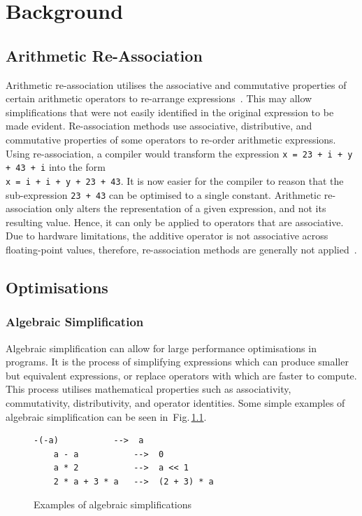 \documentclass[12pt,openany,a4paper]{book}
\newcommand{\fig}[1]  {Fig.\,\ref{#1}}		%
\begin{document}
\chapter{Background}
\label{bg}

\section{Arithmetic Re-Association}
\label{ara}

Arithmetic re-association utilises the associative and
commutative properties of certain arithmetic operators to re-arrange expressions~\cite{redund}. 
This may allow simplifications that were not easily identified in the original 
expression to be made evident. Re-association methods use associative,
distributive, and commutative properties of some operators to re-order arithmetic
expressions.
Using re-association, a compiler would transform the expression
\verb|x = 23 + i + y + 43 + i| into the form \\ \verb|x = i + i + y + 23 + 43|. It
is now easier for the compiler to reason that the sub-expression \verb|23 + 43|
can be optimised to a single constant.
Arithmetic re-association only alters the representation of a given expression,
and not its resulting value. Hence, it can only be applied to operators that
are associative. Due to hardware limitations, the additive operator is not
associative across floating-point values, therefore, re-association methods are generally not
applied~\cite{floats}.

\section{Optimisations}
\label{opt}

\subsection{Algebraic Simplification}
\label{as}

Algebraic simplification can allow for large performance optimisations in
programs. It is the process of simplifying expressions which can produce smaller
but equivalent expressions, or replace operators with which are faster to compute. 
This process utilises mathematical properties such as associativity, commutativity, 
distributivity, and operator identities. Some simple examples of algebraic
simplification can be seen in~\fig{simp}. 

\begin{figure}[htbp]
    \hspace{0.25\textwidth}
    \begin{minipage}[c]{0.5\linewidth}
    \begin{lstlisting}[frame=single, basicstyle=\ttfamily\small, tabsize=1, columns=fullflexible]
    -(-a)           -->  a
    a - a           -->  0
    a * 2           -->  a << 1
    2 * a + 3 * a   -->  (2 + 3) * a
    \end{lstlisting}
    \end{minipage}
    \caption{Examples of algebraic simplifications}
    \label{simp}
\end{figure}
\end{document}
